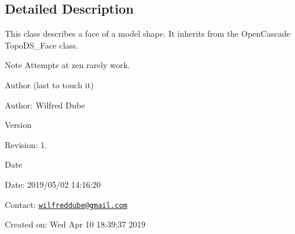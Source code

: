 \subsection{Detailed Description}
This class describes a face of a model shape. It inherits from the Open\-Cascade Topo\-D\-S\-\_\-\-Face class.

\begin{DoxyNote}{Note}
Attempts at zen rarely work.
\end{DoxyNote}
\begin{DoxyAuthor}{Author}
(last to touch it) 
\end{DoxyAuthor}
\begin{DoxyParagraph}{Author\-:}
Wilfred Dube 
\end{DoxyParagraph}


\begin{DoxyVersion}{Version}

\end{DoxyVersion}
\begin{DoxyParagraph}{Revision\-:}
1. 
\end{DoxyParagraph}


\begin{DoxyDate}{Date}

\end{DoxyDate}
\begin{DoxyParagraph}{Date\-:}
2019/05/02 14\-:16\-:20 
\end{DoxyParagraph}


Contact\-: \href{mailto:wilfreddube@gmail.com}{\tt wilfreddube@gmail.\-com}

Created on\-: Wed Apr 10 18\-:39\-:37 2019 

